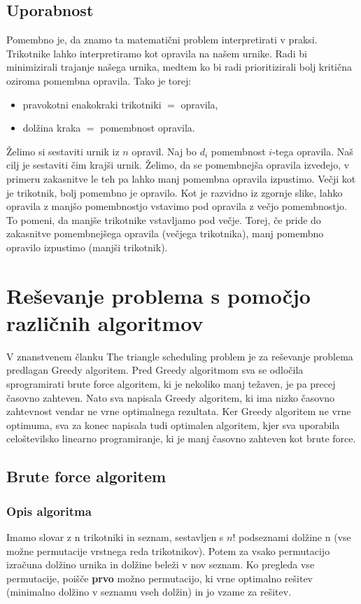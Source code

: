 \documentclass[a4paper,12pt]{article}
\theoremstyle{definition}
\theoremstyle{plain}
\begin{document}
\subsection{Uporabnost}
Pomembno je, da znamo ta matematični problem interpretirati v praksi. Trikotnike lahko interpretiramo kot opravila na našem urnike. Radi bi minimizirali trajanje našega urnika, medtem ko bi radi prioritizirali bolj kritična oziroma pomembna opravila.
Tako je torej:
\begin{itemize}
    \item pravokotni enakokraki trikotniki $=$ opravila,
    \item dolžina kraka $=$ pomembnost opravila.
\end{itemize}

Želimo si sestaviti urnik iz $n$ opravil. Naj bo $d_i$ pomembnost $i$-tega opravila. Naš cilj je sestaviti čim krajši urnik. Želimo, da se pomembnejša opravila izvedejo, v primeru zakasnitve le teh pa lahko manj pomembna opravila izpustimo.
Večji kot je trikotnik, bolj pomembno je opravilo. Kot je razvidno iz zgornje slike, lahko opravila z manjšo pomembnostjo vstavimo pod opravila z večjo pomembnostjo. To pomeni, da manjše trikotnike vstavljamo pod večje. Torej, če pride do zakasnitve
pomembnejšega opravila (večjega trikotnika), manj pomembno opravilo  izpustimo (manjši trikotnik).


\section{Reševanje problema s pomočjo različnih algoritmov}
V znanstvenem članku The triangle scheduling problem \cite{triangle} je za reševanje problema predlagan Greedy algoritem. Pred Greedy algoritmom sva se odločila sprogramirati brute force algoritem, ki je nekoliko manj težaven, je pa precej časovno zahteven. 
Nato sva napisala Greedy algoritem, ki ima nizko časovno zahtevnost vendar ne vrne optimalnega rezultata. Ker Greedy algoritem ne vrne optimuma, sva za konec napisala tudi optimalen algoritem, kjer sva uporabila celoštevilsko linearno programiranje, ki je manj časovno zahteven kot brute force.


\subsection{Brute force algoritem}
\subsubsection{Opis algoritma}
Imamo slovar z n trikotniki in seznam, sestavljen s $n!$ podseznami dolžine n
(vse možne permutacije vrstnega reda trikotnikov). Potem za vsako permutacijo izračuna dolžino urnika in 
dolžine beleži v nov seznam. Ko pregleda vse permutacije, poišče \textbf{prvo} možno permutacijo, ki vrne optimalno rešitev
(minimalno dolžino v seznamu vseh dolžin) in jo vzame za rešitev.
\end{document}
